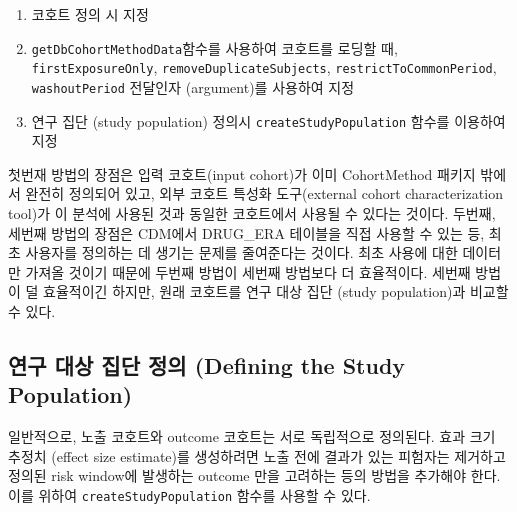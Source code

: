 \documentclass[11pt]{book}
\providecommand{\tightlist}{%
  \setlength{\itemsep}{0pt}\setlength{\parskip}{0pt}}
\theoremstyle{definition}
\theoremstyle{definition}
\theoremstyle{definition}
\theoremstyle{remark}
\begin{document}
\begin{enumerate}
\def\labelenumi{\arabic{enumi}.}
\tightlist
\item
  코호트 정의 시 지정
\item
  \texttt{getDbCohortMethodData}함수를 사용하여 코호트를 로딩할 때,
  \texttt{firstExposureOnly}, \texttt{removeDuplicateSubjects},
  \texttt{restrictToCommonPeriod}, \texttt{washoutPeriod} 전달인자
  (argument)를 사용하여 지정
\item
  연구 집단 (study population) 정의시 \texttt{createStudyPopulation}
  함수를 이용하여 지정
\end{enumerate}

첫번재 방법의 장점은 입력 코호트(input cohort)가 이미 CohortMethod
패키지 밖에서 완전히 정의되어 있고, 외부 코호트 특성화 도구(external
cohort characterization tool)가 이 분석에 사용된 것과 동일한 코호트에서
사용될 수 있다는 것이다. 두번째, 세번째 방법의 장점은 CDM에서 DRUG\_ERA
테이블을 직접 사용할 수 있는 등, 최초 사용자를 정의하는 데 생기는 문제를
줄여준다는 것이다. 최초 사용에 대한 데이터만 가져올 것이기 때문에 두번째
방법이 세번째 방법보다 더 효율적이다. 세번째 방법이 덜 효율적이긴
하지만, 원래 코호트를 연구 대상 집단 (study population)과 비교할 수
있다.

\subsection{연구 대상 집단 정의 (Defining the Study
Population)}\label{----defining-the-study-population}

일반적으로, 노출 코호트와 outcome 코호트는 서로 독립적으로 정의된다.
효과 크기 추정치 (effect size estimate)를 생성하려면 노출 전에 결과가
있는 피험자는 제거하고 정의된 risk window에 발생하는 outcome 만을
고려하는 등의 방법을 추가해야 한다. 이를 위하여
\texttt{createStudyPopulation} 함수를 사용할 수 있다.
\end{document}
